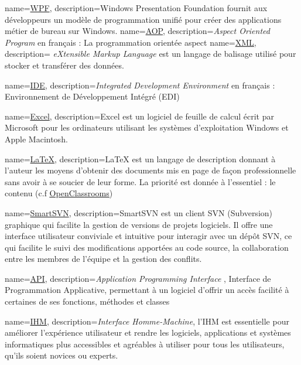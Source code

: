 \usepackage[toc,section=chapter]{glossaries}    %

\makeglossaries

{
	name=\underline{WPF},
	description={Windows Presentation Foundation fournit aux développeurs un modèle de programmation unifié pour créer des applications métier de bureau sur Windows.}
}
{
	name=\underline{AOP},
	description={\textit{Aspect Oriented Program} en français :  La programmation orientée aspect }
}
{
	name=\underline{XML},
	description={ \textit{eXtensible Markup Language} est un langage de balisage utilisé pour stocker et transférer des données.}
}

{
	name=\underline{IDE},
	description={\textit{Integrated Development Environment} en français :  Environnement de Développement Intégré (EDI) }
}

{
	name=\underline{Excel},
	description={Excel est un logiciel de feuille de calcul écrit par Microsoft pour les ordinateurs utilisant les systèmes d'exploitation Windows et Apple Macintosh.}
}

{
	name=\underline{LaTeX},
	description={LaTeX est un langage de description donnant à l'auteur les moyens d'obtenir des documents mis en page de façon professionnelle sans avoir à se soucier de leur forme. La priorité est donnée à l'essentiel : le contenu (c.f \underline{\href{https://openclassrooms.com/fr/courses/1617396-redigez-des-documents-de-qualite-avec-latex/1617565-quest-ce-que-latex}{OpenClassrooms}})}
}

{
	name=\underline{SmartSVN},
	description={SmartSVN est un client SVN (Subversion) graphique qui facilite la gestion de versions de projets logiciels. Il offre une interface utilisateur conviviale et intuitive pour interagir avec un dépôt SVN, ce qui facilite le suivi des modifications apportées au code source, la collaboration entre les membres de l'équipe et la gestion des conflits.}
}


{
	name=\underline{API},
	description={\textit{Application Programming Interface }, Interface de Programmation Applicative, permettant à un logiciel d'offrir un accès facilité à certaines de ses fonctions, méthodes et classes}
}

{
	name=\underline{IHM},
	description={\textit{Interface Homme-Machine}, l'IHM est essentielle pour améliorer l'expérience utilisateur et rendre les logiciels, applications et systèmes informatiques plus accessibles et agréables à utiliser pour tous les utilisateurs, qu'ils soient novices ou experts.}
}

\glsaddall